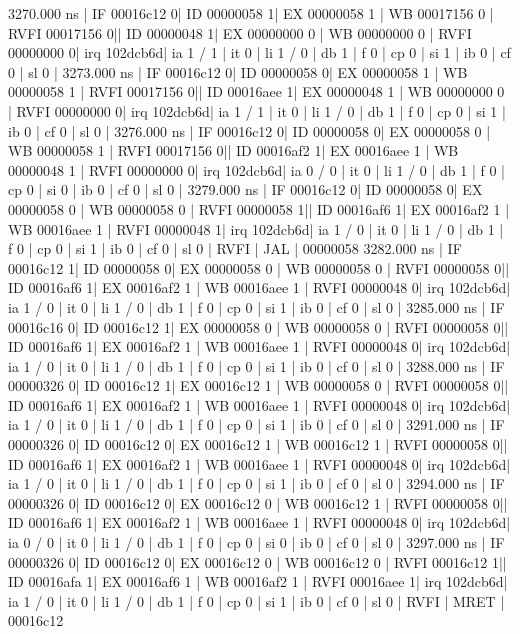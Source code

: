 \begin{terminal}
    3270.000 ns | IF 00016c12  0| ID 00000058 1| EX 00000058 1 | WB 00017156 0 | RVFI 00017156 0|| ID 00000048  1| EX 00000000 0 | WB 00000000 0 | RVFI 00000000 0| irq 102dcb6d| ia 1 / 1 | it 0 |  li 1 / 0 | db 1 | f 0 | cp 0 | si 1 | ib 0 | cf 0 | sl 0 |
    3273.000 ns | IF 00016c12  0| ID 00000058 0| EX 00000058 1 | WB 00000058 1 | RVFI 00017156 0|| ID 00016aee  1| EX 00000048 1 | WB 00000000 0 | RVFI 00000000 0| irq 102dcb6d| ia 1 / 1 | it 0 |  li 1 / 0 | db 1 | f 0 | cp 0 | si 1 | ib 0 | cf 0 | sl 0 |
    3276.000 ns | IF 00016c12  0| ID 00000058 0| EX 00000058 0 | WB 00000058 1 | RVFI 00017156 0|| ID 00016af2  1| EX 00016aee 1 | WB 00000048 1 | RVFI 00000000 0| irq 102dcb6d| ia 0 / 0 | it 0 |  li 1 / 0 | db 1 | f 0 | cp 0 | si 0 | ib 0 | cf 0 | sl 0 |
    3279.000 ns | IF 00016c12  0| ID 00000058 0| EX 00000058 0 | WB 00000058 0 | RVFI 00000058 1|| ID 00016af6  1| EX 00016af2 1 | WB 00016aee 1 | RVFI 00000048 1| irq 102dcb6d| ia 1 / 0 | it 0 |  li 1 / 0 | db 1 | f 0 | cp 0 | si 1 | ib 0 | cf 0 | sl 0 | RVFI | JAL      | 00000058
    3282.000 ns | IF 00016c12  1| ID 00000058 0| EX 00000058 0 | WB 00000058 0 | RVFI 00000058 0|| ID 00016af6  1| EX 00016af2 1 | WB 00016aee 1 | RVFI 00000048 0| irq 102dcb6d| ia 1 / 0 | it 0 |  li 1 / 0 | db 1 | f 0 | cp 0 | si 1 | ib 0 | cf 0 | sl 0 |
    3285.000 ns | IF 00016c16  0| ID 00016c12 1| EX 00000058 0 | WB 00000058 0 | RVFI 00000058 0|| ID 00016af6  1| EX 00016af2 1 | WB 00016aee 1 | RVFI 00000048 0| irq 102dcb6d| ia 1 / 0 | it 0 |  li 1 / 0 | db 1 | f 0 | cp 0 | si 1 | ib 0 | cf 0 | sl 0 |
    3288.000 ns | IF 00000326  0| ID 00016c12 1| EX 00016c12 1 | WB 00000058 0 | RVFI 00000058 0|| ID 00016af6  1| EX 00016af2 1 | WB 00016aee 1 | RVFI 00000048 0| irq 102dcb6d| ia 1 / 0 | it 0 |  li 1 / 0 | db 1 | f 0 | cp 0 | si 1 | ib 0 | cf 0 | sl 0 |
    3291.000 ns | IF 00000326  0| ID 00016c12 0| EX 00016c12 1 | WB 00016c12 1 | RVFI 00000058 0|| ID 00016af6  1| EX 00016af2 1 | WB 00016aee 1 | RVFI 00000048 0| irq 102dcb6d| ia 1 / 0 | it 0 |  li 1 / 0 | db 1 | f 0 | cp 0 | si 1 | ib 0 | cf 0 | sl 0 |
    3294.000 ns | IF 00000326  0| ID 00016c12 0| EX 00016c12 0 | WB 00016c12 1 | RVFI 00000058 0|| ID 00016af6  1| EX 00016af2 1 | WB 00016aee 1 | RVFI 00000048 0| irq 102dcb6d| ia 0 / 0 | it 0 |  li 1 / 0 | db 1 | f 0 | cp 0 | si 0 | ib 0 | cf 0 | sl 0 |
    3297.000 ns | IF 00000326  0| ID 00016c12 0| EX 00016c12 0 | WB 00016c12 0 | RVFI 00016c12 1|| ID 00016afa  1| EX 00016af6 1 | WB 00016af2 1 | RVFI 00016aee 1| irq 102dcb6d| ia 1 / 0 | it 0 |  li 1 / 0 | db 1 | f 0 | cp 0 | si 1 | ib 0 | cf 0 | sl 0 | RVFI | MRET     | 00016c12

\end{terminal}

